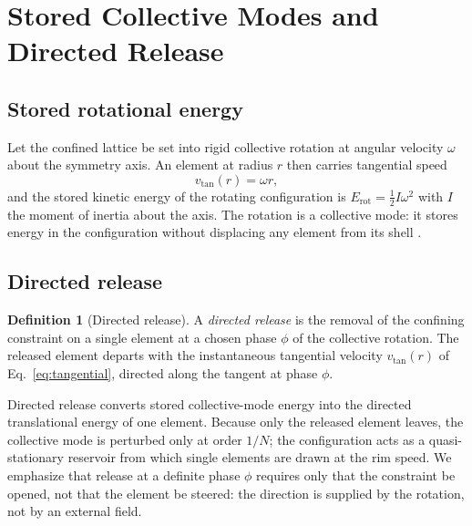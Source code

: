 \documentclass[twocolumn,10pt,a4paper]{article}
\theoremstyle{thmstyle}
\theoremstyle{definition}
\newtheorem{definition}[theorem]{Definition}
\theoremstyle{remark}
\begin{document}
\section{Stored Collective Modes and Directed Release}
\label{sec:release}

\subsection{Stored rotational energy}

Let the confined lattice be set into rigid collective rotation at angular
velocity $\omega$ about the symmetry axis. An element at radius $r$ then
carries tangential speed
\begin{equation}
v_{\mathrm{tan}}(r) = \omega r ,
\label{eq:tangential}
\end{equation}
and the stored kinetic energy of the rotating configuration is
$E_{\mathrm{rot}} = \tfrac12 I \omega^2$ with $I$ the moment of inertia about
the axis. The rotation is a collective mode: it stores energy in the
configuration without displacing any element from its shell
\citep{goldstein2002,arnold1989}.

\subsection{Directed release}

\begin{definition}[Directed release]
\label{def:release}
A \emph{directed release} is the removal of the confining constraint on a
single element at a chosen phase $\phi$ of the collective rotation. The
released element departs with the instantaneous tangential velocity
$v_{\mathrm{tan}}(r)$ of Eq.~\eqref{eq:tangential}, directed along the
tangent at phase $\phi$.
\end{definition}

Directed release converts stored collective-mode energy into the directed
translational energy of one element. Because only the released element leaves,
the collective mode is perturbed only at order $1/N$; the configuration acts
as a quasi-stationary reservoir from which single elements are drawn at the
rim speed. We emphasize that release at a definite phase $\phi$ requires only
that the constraint be opened, not that the element be steered: the direction
is supplied by the rotation, not by an external field.
\end{document}
